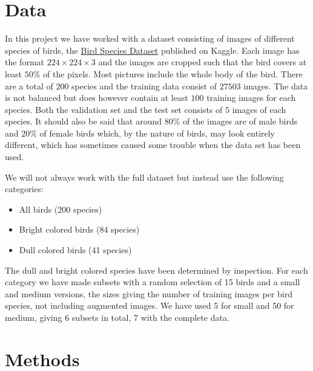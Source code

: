 \documentclass{article}
\begin{document}
\section{Data}

In this project we have worked with a dataset consisting of images of different species of birds, the  
\href{https://www.kaggle.com/gpiosenka/100-bird-species}{Bird Species Dataset} published on Kaggle. Each image has the format $224 \times 224 \times 3$ and the images are cropped such that the bird covers at least $50$\% of the pixels. Most pictures include the whole body of the bird.
There are 
a total of $200$ species and the training data consist of $27503$ images. The data is not balanced but does however contain at least $100$ training images for each species. 
Both the validation set and the test set consists of $5$ images of each species. 
It should also be said that around $80\%$ of the images are of male birds and $20\%$ of female 
birds which, by the nature of birds, may look entirely different, which has sometimes caused some trouble when the data set has been used.

We will not always work with the full dataset but instead use the following categories:

\begin{itemize}
	\item All birds (200 species)
	\item Bright colored birds (84 species)
	\item Dull colored birds (41 species)
\end{itemize}

The dull and bright colored species have been determined by inspection. For each category we have made subsets with a random selection of 15 birds and a small and medium versions, the sizes giving the number of training images per bird species, not including augmented images. We have used 5 for small and 50 for medium, giving 6 subsets in total, 7 with the complete data.


\section{Methods}

\end{document}
